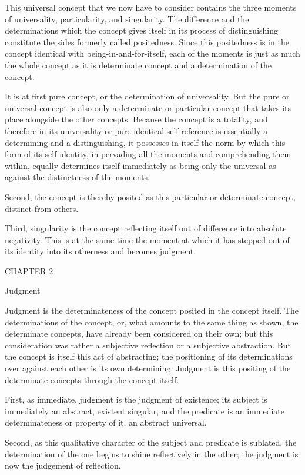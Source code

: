 This universal concept that we now have to consider
contains the three moments of
universality, particularity, and singularity.
The difference and the determinations which the concept
gives itself in its process of distinguishing constitute
the sides formerly called positedness.
Since this positedness is in the concept
identical with being-in-and-for-itself,
each of the moments is just as much
the whole concept as it is determinate concept
and a determination of the concept.

It is at first pure concept,
or the determination of universality.
But the pure or universal concept is also
only a determinate or particular concept
that takes its place alongside the other concepts.
Because the concept is a totality,
and therefore in its universality
or pure identical self-reference
is essentially a determining and a distinguishing,
it possesses in itself the norm
by which this form of its self-identity,
in pervading all the moments
and comprehending them within,
equally determines itself immediately
as being only the universal
as against the distinctness of the moments.

Second, the concept is thereby posited
as this particular or determinate concept,
distinct from others.

Third, singularity is the concept reflecting itself
out of difference into absolute negativity.
This is at the same time the moment at which
it has stepped out of its identity
into its otherness and becomes judgment.

CHAPTER 2

Judgment

Judgment is the determinateness of the concept
posited in the concept itself.
The determinations of the concept,
or, what amounts to the same thing as shown,
the determinate concepts,
have already been considered on their own;
but this consideration was rather
a subjective reflection
or a subjective abstraction.
But the concept is itself this act of abstracting;
the positioning of its determinations over
against each other is its own determining.
Judgment is this positing of the determinate concepts
through the concept itself.

First, as immediate, judgment is the judgment of existence;
its subject is immediately an abstract, existent singular,
and the predicate is an immediate determinateness or property of it,
an abstract universal.

Second, as this qualitative character of
the subject and predicate is sublated,
the determination of the one begins
to shine reflectively in the other;
the judgment is now the judgement of reflection.


